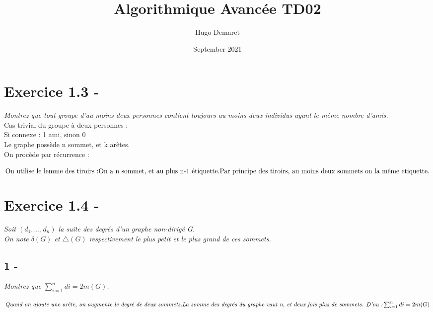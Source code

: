 \documentclass{article}
\title{Algorithmique Avancée TD02}
\author{Hugo Demaret}
\date{September 2021}
\begin{document}
\maketitle
\section*{Exercice 1.3 -}
\textit{Montrez que tout groupe d'au moins deux personnes contient toujours au moins deux individus ayant le même nombre d'amis.}\\
\textsf{Cas trivial du groupe à deux personnes :}\\
\textsf{Si connexe : 1 ami, sinon 0}\\
\textsf{Le graphe possède n sommet, et k arêtes.}\\
\textsf{On procède par récurrence :}
    \begin{center}
        $
            \textrm{On utilise le lemme des tiroirs :}
            \linebreak
            \textrm{On a n sommet, et au plus n-1 étiquette.}
            \linebreak
            \textrm{Par principe des tiroirs, au moins deux sommets on la même etiquette.}
        $
    \end{center}
\section*{Exercice 1.4 -}
    \textit{Soit $(d_{1},...,d_{n})$ la suite des degrés d'un graphe non-dirigé G.}\\
    \textit{On note $\delta(G)$ et $\bigtriangleup(G)$ respectivement le plus petit et le plus grand de ces sommets.}\\
    \subsection*{1 -}
        \textit{Montrez que $\sum_{i=1}^{n} di = 2m(G) $.}
            \begin{center}
            $
            \textit{Quand on ajoute une arête, on augmente le degré de deux sommets.}
            \linebreak
            \textit{La somme des degrés du graphe vaut n, et deux fois plus de sommets. D'ou :}
            \linebreak
            \sum_{i=1}^{n} di = 2m(G) 
            $
            \end{center}
\end{document}
